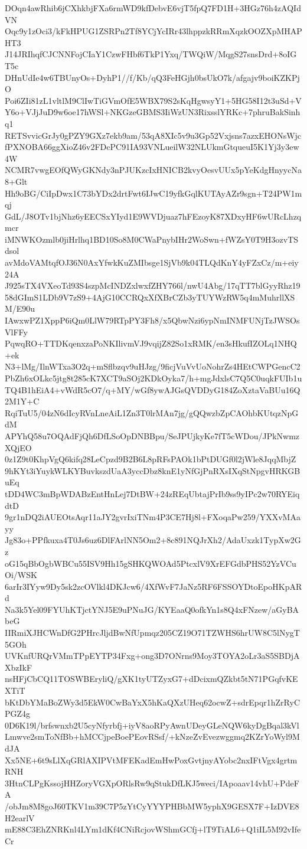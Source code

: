 DOqn4awRhib6jCXhkbjFXa6rmWD9kfDebvE6vjT5fpQ7FD1H+3HGz76h4zAQIdVN
Oqc9y1zOci3/kFkHPUG1ZSRPn2Tf8YCjYcIRr43lhppzkRRmXqzkOOZXpMHAPHT3
J14JRIhqfCJCNNFojCIaY1CzwFHbf6TkP1Yxq/TWQiW/MqgS27snsDrd+8oIGT5c
DHnUdIe4w6TBUnyOs+DyhP1//f/Kb/qQ3FeHGjh0bsUkO7k/afgajv9boiKZKPjO
Poi6ZIi81zL1vltlM9ClIwTiGVmOfE5WBX79S2sKqHgwsyY1+5HG58I12t3uSd+V
Y6o+VJjJuD9w6oe17hWSl+NKGzeGBMS3IiWzUN3RixsslYRKc+7phruBakSinhq1
RETSvvicGrJy0gPZY9GXz7ekb9am/53qA8XIc5v9u3Gp52Vxjsns7azxEHONsWjc
fPXNOBA66ggXioZ46v2FDcPC91IA93VNLueilW32NLUkmGtqueuI5K1Yj3y3ew4W
NCMR7vwgEOfQWyGKNdy3nPJUKzcIxHNICB2kvyOesvUUx5pYeKdgHnyycNa8+Glt
Hh9oBG/CiIpDwx1C73bYDx2drtFwt6IJwC19yfkGqlKUTAyAZr9sgn+T24PW1mqj
GdL/J8OTv1bjNhz6yEECSxYIyd1E9WVDjuaz7hFEzoyK87XDxyHF6wURcLhzqmcr
iMNWKOzmlb0jiHrlhq1BD10So8M0CWaPnybIHr2WoSwn+fWZsY0T9H3ozvTSdsol
avMdoVAMtqfOJ36N0AxYfwkKuZMIbsge1SjVb9k04TLQdKnY4yFZxCz/m+eiy24A
J925sTX4VXeoTd93S4szpMcINDZxlwxfZHY766l/nwU4Abg/17qTT7blGyyRhz19
58dGImS1LDb9V7zS9+4AjG10CCRQxXfXBrCZb3yTUYWzRW5q4mMuhrllXSM/E90u
IAwxwPZ1XppP6iQm0LlW79RTpPY3Fh8/x5QbwNzi6ypNmINMFUNjTzJWSOsVlFFy
PqwqRO+TTDKqenxzaPoNKIlivmVJ9vqijZ82So1xRMK/en3sHkufIZOLq1NHQ+ek
N3+lMg/IlnWTxa3O2q+mSflbzqv9uHJzg/9ficjVuVvUoNohrZs4HEtCWPGencC2
PbZh6xOLkc5jtg8t285cK7XCT9aSOj2KDkOyka7/h+mgJdxlsC7Q5C0uqkFUIb1u
TQ4B1hEiA4+vWdR5cO7/q+MY/wGf8ywAJGsQVDDyG184ZoXztaVaBUu16Q2M1Y+C
RqiTuU5/04zN6dIcyRVnLneAiL1Zn3T0lrMAn7jg/gQQwzbZpCAOhbKUtqzNpGdM
APYhQ58u7OQAdFjQh6DfLSoOpDNBBpu/SeJPUjkyKe7fT5cWDou/JPkNwmzXQjEO
0z1Z9t0KhpVgQ6kifq28LeCpzd9B2B6L8pRFsPAOk1bPtDUGf0l2jWle8JqqMbjZ
9hKYt3iYuykWLKYBuvkszdUaA3yccDbz8knE1yNfGjPnRXsIXqStNpgvHRKGBuEq
tDD4WC3mBpWDABzEntHnLej7DtBW+24zREqUbtajPrIb9ss9yIPc2w70RYEiqdtD
9gr1nDQ2iAUEOtsAqr11aJY2gvrIxiTNm4P3CE7Hj8l+FXoqaPw259/YXXvMAayy
Jg83o+PPfkuxa4T0Js6uz6DlFArlNN5Om2+8c891NQJrXh2/AdaUxzk1TypXw2Gz
oG15qBbOgbWBCu55ISV9Hh15gSHKQWOAd5PtcxlV9XrEFGdbPHS52YzVCuOi/WSK
6arIr3IYyw9Dy5sk2zcOVlkl4DKJcw6/4XfWvF7JaNz5RF6FSSOYDtoEpoHKpARd
Na3k5Yel09FYUhKTjctYNJ5E9uPNuJG/KYEaaQ0ofkYn1s8Q4xFNzew/aGyBAbeG
IIRmiXJHCWnDfG2PHrcJljdBwNfUpmqz205CZ19O71TZWHS6hrUW8C5lNygT5GOh
UVKnfURQrVMmTPpEYTP34Fxg+ong3D7ONrns9Moy3TOYA2oLr3aS5SBDjAXbzIkF
nsHFjCbCQ11TOSWBEryliQ/gXK1tyUTZyxG7+dDcixmQZkbt5tN71PGqfvKEXTiT
bKtDbYMaBoZWy3d5EkW0CwBaYxX5hKaQXzUHeq62ocwZ+sdrEpqr1hZrRyCPGZ4g
0D6K19l/brfswnxb2U5cyNfyrbfj+iyV8aoRPyAwnUDeyGLeNQW6kyDgBqal3kVl
Lmwve2smToNfBb+hMCCjpeBoePEovRSsf/+kNzeZvEvezwggmq2KZrYoWyl9MdJA
Xx5NE+6t9sLlXqGRlAXIPVtMFEKadEmHwPoxGvtjnyAYobc2nxIFtVgx4grtmRNH
3HtnCLPgKssojHHZoryVGXpORlsRw9qStukDfLKJ5weci/IApoaav14vhU+PdeFA
/obJm8M8goJ60TKV1m39C7P5zYtCyYYYPHBbMW5yphX9GESX7F+IzDVE8H2earlV
mE88C3EhZNRKnl4LYm1dKf4CNiRcjovWShmGCfj+lT9TiAL6+Q1iIL5M92vIfeCr
